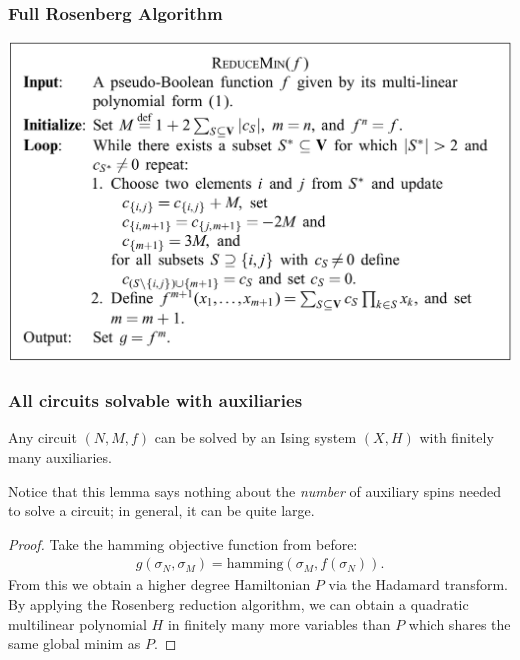 \documentclass[8pt, mathserif, notheorems]{beamer}
\begin{document}
\begin{frame}[t]\frametitle{Full Rosenberg Algorithm}
  \begin{center}
    \includegraphics[width=1\textwidth]{images/rosenberg-algo.png}
  \end{center}
\end{frame}
\begin{frame}[t]\frametitle{All circuits solvable with auxiliaries}
  \begin{prop}\label{prop:all-circuits-solvable-with-auxiliaries}
    Any circuit $(N,M,f)$ can be solved by an Ising system $(X,H)$ with finitely many auxiliaries.
  \end{prop}
Notice that this lemma says nothing about the \textit{number} of auxiliary spins needed to solve a circuit; in general, it can be quite large.
\begin{proof}
  Take the hamming objective function from before:
  \begin{align*}
    g(\sigma_N, \sigma_M) = \text{hamming}(\sigma_M, f(\sigma_N)).
  \end{align*}
  From this we obtain a higher degree Hamiltonian $P$ via the Hadamard transform. By applying the Rosenberg reduction algorithm, we can obtain a quadratic multilinear polynomial $H$ in finitely many more variables than $P$ which shares the same global minim as $P$.
\end{proof}
\end{frame}
\end{document}
